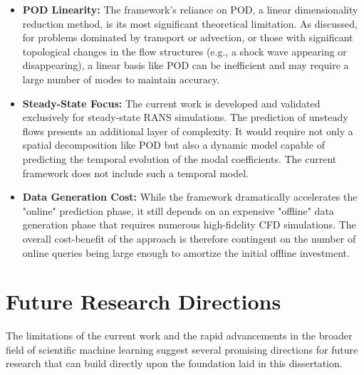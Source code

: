 \documentclass[dscexam, EN]{ufabcFHZh}
\begin{document}
\begin{itemize}
    \item \textbf{POD Linearity:} The framework's reliance on POD, a linear dimensionality reduction method, is its most significant theoretical limitation. As discussed, for problems dominated by transport or advection, or those with significant topological changes in the flow structures (e.g., a shock wave appearing or disappearing), a linear basis like POD can be inefficient and may require a large number of modes to maintain accuracy.

    \item \textbf{Steady-State Focus:} The current work is developed and validated exclusively for steady-state RANS simulations. The prediction of unsteady flows presents an additional layer of complexity. It would require not only a spatial decomposition like POD but also a dynamic model capable of predicting the temporal evolution of the modal coefficients. The current framework does not include such a temporal model.

    \item \textbf{Data Generation Cost:} While the framework dramatically accelerates the "online" prediction phase, it still depends on an expensive "offline" data generation phase that requires numerous high-fidelity CFD simulations. The overall cost-benefit of the approach is therefore contingent on the number of online queries being large enough to amortize the initial offline investment.
\end{itemize}

\section{Future Research Directions}

The limitations of the current work and the rapid advancements in the broader field of scientific machine learning suggest several promising directions for future research that can build directly upon the foundation laid in this dissertation.
\end{document}
